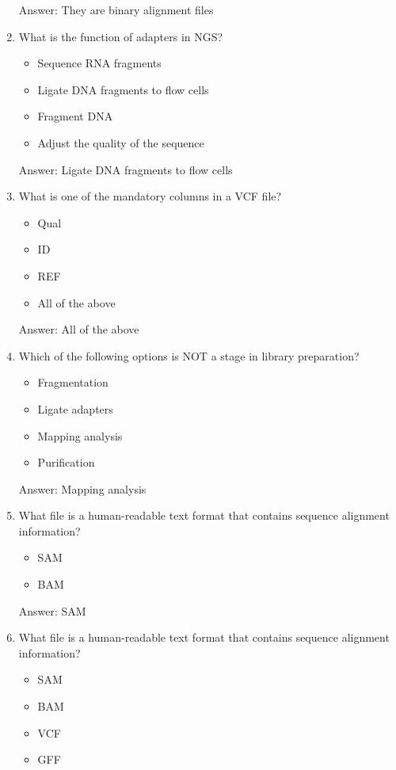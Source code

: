 \begin{enumerate}
Answer: They are binary alignment files

\item What is the function of adapters in NGS?
\begin{itemize}
\item Sequence RNA fragments
\item Ligate DNA fragments to flow cells
\item Fragment DNA
\item Adjust the quality of the sequence
\end{itemize}

Answer: Ligate DNA fragments to flow cells

\item What is one of the mandatory columns in a VCF file?
\begin{itemize}
\item Qual
\item ID
\item REF
\item All of the above
\end{itemize}

Answer: All of the above

\item Which of the following options is NOT a stage in library preparation?
\begin{itemize}
\item Fragmentation
\item Ligate adapters
\item Mapping analysis
\item Purification
\end{itemize}

Answer: Mapping analysis

\item What file is a human-readable text format that contains sequence alignment information?
\begin{itemize}
\item SAM
\item BAM
\end{itemize}

Answer: SAM

\item What file is a human-readable text format that contains sequence alignment information?
\begin{itemize}
\item SAM
\item BAM
\item VCF
\item GFF
\end{itemize}


\end{enumerate}

